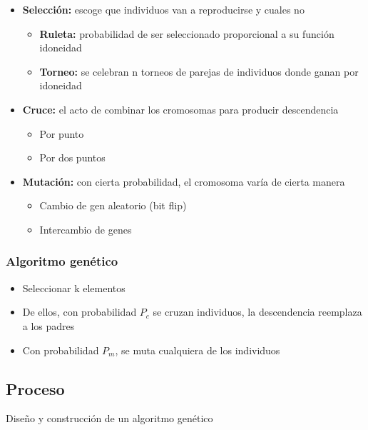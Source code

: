 \documentclass[12pt]{article}
\begin{document}
    \begin{itemize}
    \item \textbf{Selección:} escoge que individuos van a reproducirse y cuales no
        \begin{itemize}
        \item \textbf{Ruleta:} probabilidad de ser seleccionado proporcional a su función idoneidad
        \item \textbf{Torneo:} se celebran n torneos de parejas de individuos donde ganan por idoneidad
        \end{itemize}
    \item \textbf{Cruce:} el acto de combinar los cromosomas para producir descendencia
        \begin{itemize}
        \item Por punto
        \item Por dos puntos
        \end{itemize}
    \item \textbf{Mutación:} con cierta probabilidad, el cromosoma varía de cierta manera
        \begin{itemize}
        \item Cambio de gen aleatorio (bit flip)
        \item Intercambio de genes
        \end{itemize}
    \end{itemize}

    \subsubsection{Algoritmo genético}

    \begin{itemize}
    \item Seleccionar k elementos
    \item De ellos, con probabilidad $P_c$ se cruzan individuos, la descendencia reemplaza a los padres
    \item Con probabilidad $P_m$, se muta cualquiera de los individuos
    \end{itemize}

    \subsection{Proceso}

    Diseño y construcción de un algoritmo genético
\end{document}
